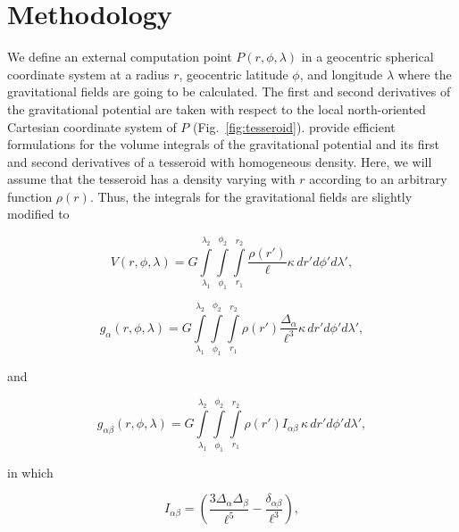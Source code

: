 \documentclass[extra]{gji}
\begin{document}

\section{Methodology}

We define an external computation point $P(r, \phi, \lambda)$ in a geocentric spherical
coordinate system at a radius $r$, geocentric latitude $\phi$, and longitude $\lambda$
where the gravitational fields are going to be calculated.
The first and second derivatives of the gravitational potential are taken with
respect to the local north-oriented Cartesian coordinate system of $P$
(Fig.~\ref{fig:tesseroid}).
\citet{Grombein2013} provide efficient formulations for the volume integrals of the
gravitational potential and its first and second derivatives of a tesseroid with
homogeneous density.
Here, we will assume that the tesseroid has a density varying with $r$ according to an
arbitrary function $\rho(r)$.
Thus, the integrals for the gravitational fields are slightly modified to

\begin{equation}
    V(r,\phi,\lambda) = G
    \int\limits_{\lambda_1}^{\lambda_2}
    \int\limits_{\phi_1}^{\phi_2}
    \int\limits_{r_1}^{r_2}
    \frac{\rho(r')}{\ell} \kappa \,  dr' d\phi' d\lambda',
\label{eq:tesseroid-pot}
\end{equation}

\begin{equation}
    g_{\alpha}(r,\phi,\lambda) = G
    \int\limits_{\lambda_1}^{\lambda_2}
    \int\limits_{\phi_1}^{\phi_2}
    \int\limits_{r_1}^{r_2}
    \rho(r') \frac{\Delta_\alpha}{\ell^3}
    \kappa \, dr' d\phi' d\lambda',
\label{eq:tesseroid-grav}
\end{equation}

\noindent and

\begin{equation}
    g_{\alpha\beta}(r,\phi,\lambda) = G
    \int\limits_{\lambda_1}^{\lambda_2}
    \int\limits_{\phi_1}^{\phi_2}
    \int\limits_{r_1}^{r_2}
    \rho(r') I_{\alpha\beta} \, \kappa \, dr' d\phi' d\lambda' ,
    \label{eq:tesseroid-tensor}
\end{equation}

\noindent in which

\begin{equation}
    I_{\alpha\beta} =
    \left(
        \frac{3\Delta_{\alpha} \Delta_{\beta}}{\ell^5} -
        \frac{\delta_{\alpha\beta}}{\ell^3}
    \right) ,
    \label{eq:tesseroid-tensor-kernel}
\end{equation}
\end{document}
